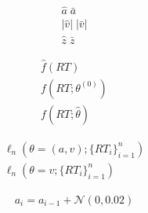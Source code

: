 \documentclass[8pt,aspectratio=169]{beamer}
\begin{document}
\begin{frame}{}
    \begin{align}
        \hat{a}\; \bar{a}\\
        |\hat{v}|\; |\bar{v}|\\
        \hat{z}\; \bar{z}
    \end{align}

    \begin{align}
         \hat{f}(RT)\\
         f(RT; \theta^{(0)})\\
         f(RT; \hat\theta)
    \end{align}

    \begin{align}
         \ell_n (\theta=(a,v) ; \{RT_i\}_{i=1}^n)\\
         \ell_n (\theta=v ; \{RT_i\}_{i=1}^n)
    \end{align}

    \begin{align}
        a_i = a_{i-1} + \mathcal{N}(0, 0.02)
    \end{align}
\end{frame}

\begin{frame}{}
    
\end{frame}
\end{document}

